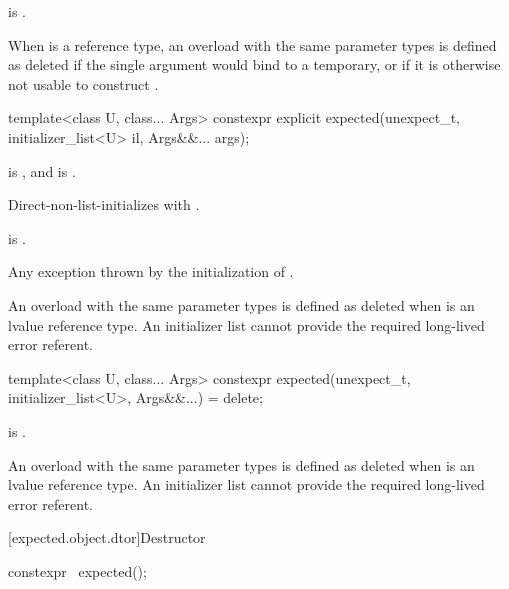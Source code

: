 \begin{itemdescr}
\pnum
\constraints
{} is .

\pnum
\remarks
When  is a reference type, an overload with the same parameter types is defined as deleted if the single argument would bind  to a temporary, or if it is otherwise not usable to construct .
\end{itemdescr}

%
\begin{itemdecl}
template<class U, class... Args>
  constexpr explicit expected(unexpect_t, initializer_list<U> il, Args&&... args);
\end{itemdecl}

\begin{itemdescr}
\pnum
\constraints
{} is , and  is .

\pnum
\effects
Direct-non-list-initializes  with .

\pnum
\ensures
{} is .

\pnum
\throws
Any exception thrown by the initialization of .

\pnum
\remarks
An overload with the same parameter types is defined as deleted when  is an lvalue reference type. An initializer list cannot provide the required long-lived error referent.
\end{itemdescr}

%
\begin{itemdecl}
template<class U, class... Args>
  constexpr expected(unexpect_t, initializer_list<U>, Args&&...) = delete;
\end{itemdecl}

\begin{itemdescr}
\pnum
\constraints
{} is .

\pnum
\remarks
An overload with the same parameter types is defined as deleted when  is an lvalue reference type. An initializer list cannot provide the required long-lived error referent.
\end{itemdescr}

[expected.object.dtor]{Destructor}

%
\begin{itemdecl}
constexpr ~expected();
\end{itemdecl}

